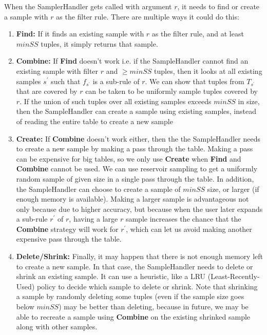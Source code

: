 \documentclass{sig-alternate}
\begin{document}
When the SamplerHandler gets called with argument $r$, it needs to find or create a sample with $r$ as the filter rule. There are multiple ways it could do this:
\begin{enumerate}
\item \textbf{Find:} If it finds an existing sample with $r$ as the filter rule, and at least $minSS$ tuples, it simply returns that sample.
\item \textbf{Combine:} If \textbf{Find} doesn't work i.e. if the SampleHandler cannot find an existing sample with filter $r$ and $\geq minSS$ tuples, then it looks at all existing samples $s^{\prime}$ such that $f_{s^{\prime}}$ is a sub-rule of $r$. We can show that tuples from $T_{s^{\prime}}$ that are covered by $r$ can be taken to be uniformly sample tuples covered by $r$. If the union of such tuples over all existing samples exceeds $minSS$ in size, then the SampleHandler can create a sample using existing samples, instead of reading the entire table to create a new sample
\item \textbf{Create:} If \textbf{Combine} doesn't work either, then the the SampleHandler needs to create a new sample by making a pass through the table. Making a pass can be expensive for big tables, so we only use \textbf{Create} when \textbf{Find} and \textbf{Combine} cannot be used. We can use reservoir sampling to get a uniformly random sample of given size in a single pass through the table. In addition, the SampleHandler can choose to create a sample of $minSS$ size, or larger (if enough memory is available). Making a larger sample is advantageous not only because due to higher accuracy, but because when the user later expands a sub-rule $r^{\prime}$ of $r$, having a large $r$ sample increases the chance that the \textbf{Combine} strategy will work for $r^{\prime}$, which can let us avoid making another expensive pass through the table.
\item \textbf{Delete/Shrink:} Finally, it may happen that there is not enough memory left to create a new sample. In that case, the SampleHandler needs to delete or shrink an existing sample. It can use a heuristic, like a LRU (Least-Recently-Used) policy to decide which sample to delete or shrink. Note that shrinking a sample by randomly deleting some tuples (even if the sample size goes below $minSS$) may be better than deleting, because in future, we may be able to recreate a sample using \textbf{Combine} on the existing shrinked sample along with other samples.
\end{enumerate}
\end{document}
